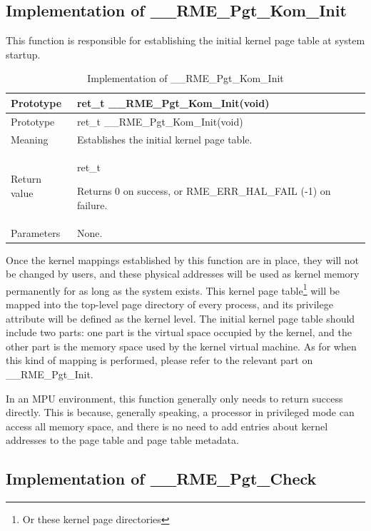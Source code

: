 \subsection{Implementation of \_\_RME\_Pgt\_Kom\_Init}\label{subsec:7-rme-pgt-kom-init-implementation}

This function is responsible for establishing the initial kernel page table at system startup.

\begin{xltabular}{\textwidth}{@{}>{\hsize\raggedright\arraybackslash}X>{\hsize\raggedright\arraybackslash}X@{}}
\caption{Implementation of \_\_RME\_Pgt\_Kom\_Init}\label{tab:7-75-rme-pgt-kom-init-implementation}\\
\toprule
Prototype & ret\_t \_\_RME\_Pgt\_Kom\_Init(void)\tabularnewline
\endfirsthead
\toprule
Prototype & ret\_t \_\_RME\_Pgt\_Kom\_Init(void)\tabularnewline
\midrule
\endhead
\bottomrule
\endlastfoot
Meaning & Establishes the initial kernel page table.\tabularnewline
Return value\strut
 & ret\_t

Returns 0 on success, or RME\_ERR\_HAL\_FAIL (-1) on failure.\strut
\tabularnewline
Parameters & None.\tabularnewline
\end{xltabular}
\nopagebreak[4]

Once the kernel mappings established by this function are in place, they will not be changed by users, and these physical addresses will be used as kernel memory permanently for as long as the system exists. This kernel page table\footnote{Or these kernel page directories} will be mapped into the top-level page directory of every process, and its privilege attribute will be defined as the kernel level. The initial kernel page table should include two parts: one part is the virtual space occupied by the kernel, and the other part is the memory space used by the kernel virtual machine. As for when this kind of mapping is performed, please refer to the relevant part on \_\_RME\_Pgt\_Init.

In an MPU environment, this function generally only needs to return success directly. This is because, generally speaking, a processor in privileged mode can access all memory space, and there is no need to add entries about kernel addresses to the page table and page table metadata.

\subsection{Implementation of \_\_RME\_Pgt\_Check}\label{subsec:7-rme-pgt-check-implementation}

